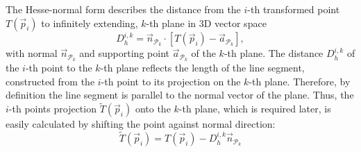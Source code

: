 The Hesse-normal form describes the distance from the $i$-th transformed point $T(\vec{p}_i)$ to infinitely extending, $k$-th plane in 3D vector space
\begin{equation}\label{eq:hesse}
	D_{h}^{i,k} = \vec{n}_{\mathcal{P}_k} \cdot \left[ T(\vec{p}_i) - \vec{a}_{\mathcal{P}_k} \right] ,
\end{equation}
with normal $\vec{n}_{\mathcal{P}_k}$ and supporting point $\vec{a}_{\mathcal{P}_k}$ of the $k$-th plane.
The distance $D_{h}^{i,k}$ of the $i$-th point to the $k$-th plane reflects the length of the line segment, constructed from the $i$-th point to its projection on the $k$-th plane.
Therefore, by definition the line segment is parallel to the normal vector of the plane.
Thus, the $i$-th points projection $\widetilde{T}(\vec{p}_i)$ onto the $k$-th plane, which is required later, is easily calculated by shifting the point against normal direction:
\begin{equation}\label{eq:projection}
	\widetilde{T}(\vec{p}_i) = T(\vec{p}_i) - D_{h}^{i,k} \vec{n}_{\mathcal{P}_k}
\end{equation}

